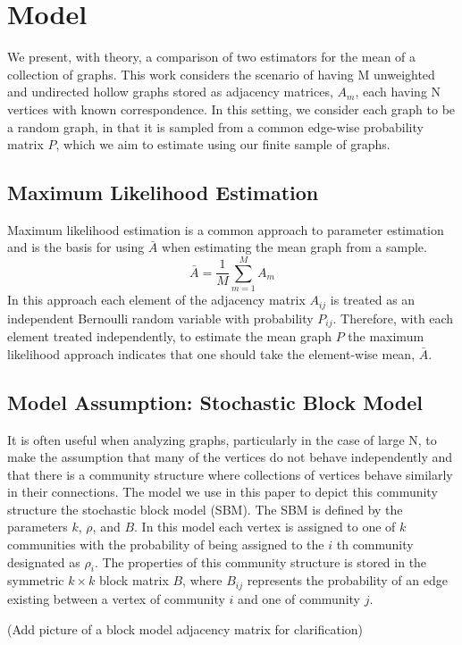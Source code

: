 \section{Model}
We present, with theory, a comparison of two estimators for the mean of a collection of graphs.  This work considers the scenario of having M unweighted and undirected hollow graphs stored as adjacency matrices, $A_m$, each having N vertices with known correspondence.  In this setting, we consider each graph to be a random graph, in that it is sampled from a common edge-wise probability matrix $P$, which we aim to estimate using our finite sample of graphs.
\subsection{Maximum Likelihood Estimation}
Maximum likelihood estimation is a common approach to parameter estimation and is the basis for using $\bar{A}$ when estimating the mean graph from a sample.
\begin{equation}
\bar{A} = \frac{1}{M}\sum\limits_{m = 1}^M A_m
\end{equation}
In this approach each element of the adjacency matrix $A_{ij}$ is treated as an independent Bernoulli random variable with probability $P_{ij}$.  Therefore, with each element treated independently, to estimate the mean graph $P$ the maximum likelihood approach indicates that one should take the element-wise mean, $\bar{A}$.
\subsection{Model Assumption: Stochastic Block Model}
It is often useful when analyzing graphs, particularly in the case of large N, to make the assumption that many of the vertices do not behave independently and that there is a community structure where collections of vertices behave similarly in their connections. The model we use in this paper to depict this community structure the stochastic block model (SBM).  The SBM is defined by the parameters $k$, $\rho$, and $B$. In this model each vertex is assigned to one of $k$ communities with the probability of being assigned to the $i$ th community designated as $\rho_i$.  The properties of this community structure is stored in the symmetric $k\times k$ block matrix $B$, where $B_{ij}$ represents the probability of an edge existing between a vertex of community $i$ and one of community $j$.

(Add picture of a block model adjacency matrix for clarification)

